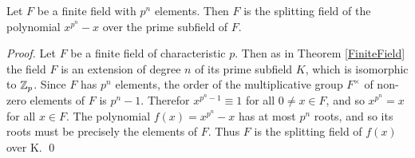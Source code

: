 \begin{theorem}
Let $F$ be a finite field with $p^n$ elements. Then $F$ is the splitting field of the polynomial $x^{p^n}-x$ over the prime subfield of $F$. 
\end{theorem}

\begin{proof}
Let $F$ be a finite field of characteristic $p$. Then as in Theorem \ref{FiniteField} the field $F$ is an extension of degree $n$ of its prime subfield $K$, which is isomorphic to $\mathbb{Z}_p$. Since $F$ has $p^n$ elements, the order of the multiplicative group $F^\times$ of non-zero elements of $F$ is $p^n - 1$. Therefor $x^{p^n-1} \equiv 1$ for all $0\ne x\in F$, and so $x^{p^n} = x$ for all $x\in F$. The polynomial $f(x) = x^{p^n} - x$ has at most $p^n$ roots, and so its roots must be precisely the elements of $F$. Thus $F$ is the splitting field of $f(x)$ over K. \qed
\end{proof}
